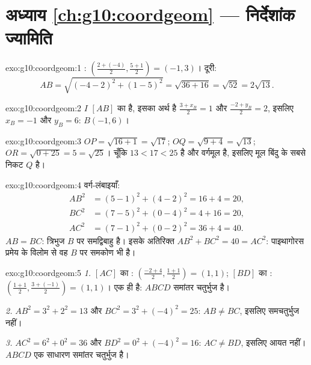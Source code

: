 \section*{अध्याय \ref{ch:g10:coordgeom} --- निर्देशांक ज्यामिति}

\begin{solution}{exo:g10:coordgeom:1}
: $\left(\frac{2 + (-4)}{2}, \frac{5 + 1}{2}\right) = (-1, 3)$।
दूरी:
\[
AB = \sqrt{(-4 - 2)^2 + (1 - 5)^2} = \sqrt{36 + 16} = \sqrt{52}
= 2\sqrt{13}.
\]
\end{solution}

\begin{solution}{exo:g10:coordgeom:2}
$I$ $[AB]$ का  है, इसका अर्थ है $\frac{3 + x_B}{2} = 1$ और $\frac{-2 + y_B}{2} = 2$, इसलिए $x_B = -1$ और $y_B = 6$: $B(-1, 6)$।
\end{solution}

\begin{solution}{exo:g10:coordgeom:3}
$OP = \sqrt{16 + 1} = \sqrt{17}$; $OQ = \sqrt{9 + 4} = \sqrt{13}$; $OR = \sqrt{0 + 25} = 5 = \sqrt{25}$। चूँकि $13 < 17 < 25$ है और वर्गमूल  है, इसलिए मूल बिंदु के
सबसे निकट $Q$ है।
\end{solution}

\begin{solution}{exo:g10:coordgeom:4}
वर्ग-लंबाइयाँ:
\begin{align*}
AB^2 &= (5-1)^2 + (4-2)^2 = 16 + 4 = 20, \\
BC^2 &= (7-5)^2 + (0-4)^2 = 4 + 16 = 20, \\
AC^2 &= (7-1)^2 + (0-2)^2 = 36 + 4 = 40 .
\end{align*}
$AB = BC$: त्रिभुज $B$ पर समद्विबाहु है। इसके अतिरिक्त $AB^2 + BC^2 = 40 = AC^2$: पाइथागोरस प्रमेय
के विलोम से वह $B$ पर समकोण भी है।
\end{solution}

\begin{solution}{exo:g10:coordgeom:5}
\emph{1.} $[AC]$ का : $\left(\frac{-2+4}{2}, \frac{1+1}{2}\right) = (1, 1)$; $[BD]$ का : $\left(\frac{1+1}{2}, \frac{3+(-1)}{2}\right) = (1, 1)$।  एक ही
है: $ABCD$ समांतर चतुर्भुज है।

\emph{2.} $AB^2 = 3^2 + 2^2 = 13$ और $BC^2 = 3^2 + (-4)^2 = 25$: $AB \neq BC$, इसलिए समचतुर्भुज नहीं।

\emph{3.} $AC^2 = 6^2 + 0^2 = 36$ और $BD^2 = 0^2 + (-4)^2 = 16$: $AC \neq BD$, इसलिए आयत नहीं। $ABCD$ एक साधारण समांतर
चतुर्भुज है।
\end{solution}

